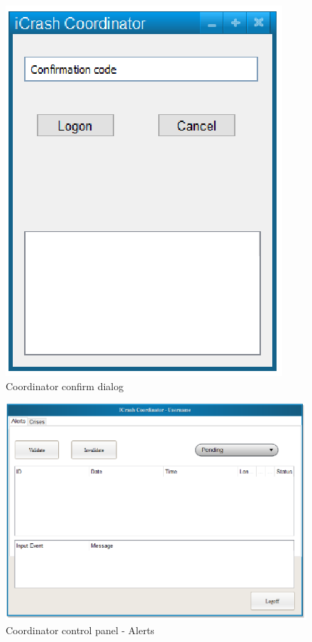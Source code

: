 \begin{figure}
  \centering
    \includegraphics{images/mockups/feature1-login/CoordinatorConfirm.eps}
  \caption{Coordinator confirm dialog}
  \label{fig:CoordinatorConfirm}
\end{figure}


\begin{figure}
  \centering
    \includegraphics[scale=0.75]{images/mockups/other/CoordinatorControlPanelAlerts.eps}
  \caption{Coordinator control panel - Alerts}
  \label{fig:CoordinatorControlPanelAlerts}
\end{figure}



